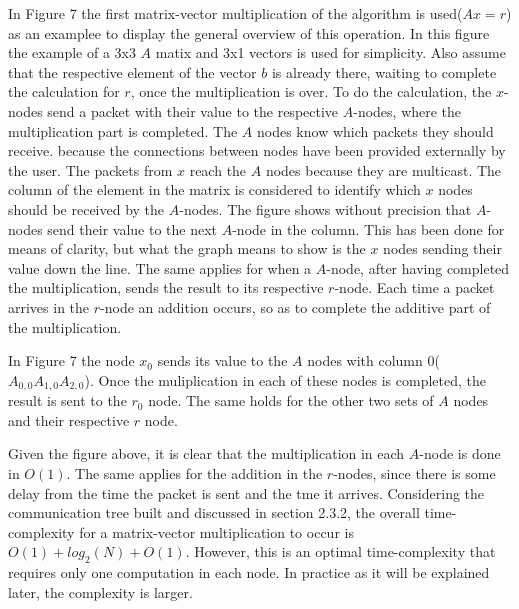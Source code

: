 \documentclass[12pt,a4paper]{article}
\begin{document}
In Figure 7 the first matrix-vector multiplication of the algorithm is used($Ax=r$) as an examplee to display the general overview of this operation. In this figure the example of a 3x3 $A$ matix and 3x1 vectors is used for simplicity. Also assume that the respective element of the vector $b$ is already there, waiting to complete the calculation for $r$, once the multiplication is over. To do the calculation, the $x$-nodes send a packet with their value to the respective $A$-nodes, where the multiplication part is completed. The $A$ nodes know which packets they should receive. because the connections between nodes have been provided externally by the user. The packets from $x$ reach the $A$ nodes because they are multicast. The column of the element in the matrix is considered to identify which $x$ nodes should be received by the $A$-nodes. The figure shows without precision that $A$-nodes send their value to the next $A$-node in the column. This has been done for means of clarity, but what the graph means to show is the $x$ nodes sending their value down the line. The same applies for when a $A$-node, after having completed the multiplication, sends the result to its respective $r$-node. Each time a packet arrives in the $r$-node an addition occurs, so as to complete the additive part of the multiplication. 

In Figure 7 the node $x_0$ sends its value to the $A$ nodes with column 0($A_{0,0} A_{1,0} A_{2,0}$). Once the muliplication in each of these nodes is completed, the result is sent to the $r_0$ node. The same holds for the other two sets of $A$ nodes and their respective $r$ node. 

Given the figure above, it is clear that the multiplication in each $A$-node is done in $O(1)$. The same applies for the addition in the $r$-nodes, since there is some delay from the time the packet is sent and the tme it arrives. Considering the communication tree built and discussed in section 2.3.2, the overall time-complexity for a matrix-vector multiplication to occur is $O(1)+log_2(N)+O(1)$. However, this is an optimal time-complexity that requires only one computation in each node. In practice as it will be explained later, the complexity is larger.
\end{document}
